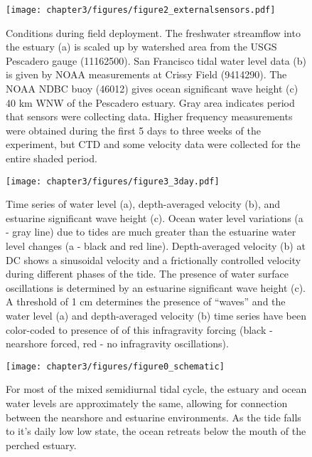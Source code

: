 \begin{figure}
\texttt{[image: chapter3/figures/figure2\_externalsensors.pdf]}

\protect\caption{Conditions during field deployment. The freshwater streamflow into
the estuary (a) is scaled up by watershed area from the USGS Pescadero
gauge (11162500). San Francisco tidal water level data (b) is given
by NOAA measurements at Crissy Field (9414290). The NOAA NDBC buoy
(46012) gives ocean significant wave height (c) 40 km WNW of the Pescadero
estuary. Gray area indicates period that sensors were collecting data.
Higher frequency measurements were obtained during the first 5 days
to three weeks of the experiment, but CTD and some velocity data were
collected for the entire shaded period. \label{f2_QTHs}}


\end{figure}


\begin{figure}
\texttt{[image: chapter3/figures/figure3\_3day.pdf]}

\protect\caption{Time series of water level (a), depth-averaged velocity (b), and estuarine
significant wave height (c). Ocean water level variations (a - gray
line) due to tides are much greater than the estuarine water level
changes (a - black and red line). Depth-averaged velocity (b) at DC
shows a sinusoidal velocity and a frictionally controlled velocity
during different phases of the tide. The presence of water surface
oscillations is determined by an estuarine significant wave height
(c). A threshold of 1 cm determines the presence of ``waves'' and
the water level (a) and depth-averaged velocity (b) time series have
been color-coded to presence of of this infragravity forcing (black
- nearshore forced, red - no infragravity oscillations). \label{f3_HUHse}}
\end{figure}


\begin{figure}
\texttt{[image: chapter3/figures/figure0\_schematic]}

\protect\caption{For most of the mixed semidiurnal tidal cycle, the estuary and ocean
water levels are approximately the same, allowing for connection between
the nearshore and estuarine environments. As the tide falls to it's
daily low low state, the ocean retreats below the mouth of the perched
estuary.\label{f4_wl_schematic}}
\end{figure}

